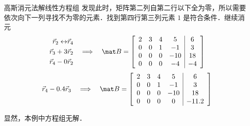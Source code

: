 \begin{exam}{高斯消元法解线性方程组}
发现此时，矩阵第二列自第二行以下全为零，所以需要依次向下一列寻找不为零的元素．找到第四行第三列元素 $1$ 是符合条件．继续消元
\begin{equation}
\begin{aligned}
\vec r_2 \leftrightarrow &\vec r_4 \\
\vec r_3 + 3 &\vec r_2 \\
\vec r_4 - 0 &\vec r_2 \\
\end{aligned}
\quad \Longrightarrow \quad
\mat B={
	\left[ \begin{array}{cccc|c}
	2 &3 &4  &5   &6  \\
	0 &0 &1  &-1  &3  \\
	0 &0 &0  &-10 &18 \\
	0 &0 &0  &-4 &-4  \\
	\end{array} 
	\right ]}
\end{equation}
\begin{equation}
\vec r_4 - 0.4 \vec r_3
\quad \Longrightarrow \quad
\mat B={
	\left[ \begin{array}{cccc|c}
	2 &3 &4  &5   &6  \\
	0 &0 &1  &-1  &3  \\
	0 &0 &0  &-10 &18 \\
	0 &0 &0  &0   &-11.2  \\
	\end{array} 
	\right ]}
\end{equation}

显然，本例中方程组无解．
\end{exam}

